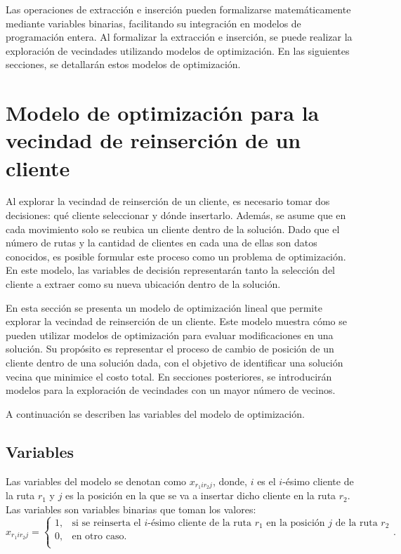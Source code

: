 \documentclass[12pt]{report}
\begin{document}
	Las operaciones de extracción e inserción pueden formalizarse matemáticamente mediante variables binarias, facilitando su integración en modelos de programación entera. Al formalizar la extracción e inserción, se puede realizar la exploración de vecindades utilizando modelos de optimización. En las siguientes secciones, se detallarán estos modelos de optimización.

		\section {Modelo de optimización para la vecindad de reinserción de un cliente}
	\label{sec:Modelo de optimización para la vecindad de reinserción de un cliente}

	Al explorar la vecindad de reinserción de un cliente, es necesario tomar dos decisiones: qué cliente seleccionar y dónde insertarlo. Además, se asume que en cada movimiento solo se reubica un cliente dentro de la solución. Dado que el número de rutas y la cantidad de clientes en cada una de ellas son datos conocidos, es posible formular este proceso como un problema de optimización. En este modelo, las variables de decisión representarán tanto la selección del cliente a extraer como su nueva ubicación dentro de la solución.

	En esta sección se presenta un modelo de optimización lineal que permite explorar la vecindad de reinserción de un cliente. Este modelo muestra cómo se pueden utilizar modelos de optimización para evaluar modificaciones en una solución. Su propósito es representar el proceso de cambio de posición de un cliente dentro de una solución dada, con el objetivo de identificar una solución vecina que minimice el costo total. En secciones posteriores, se introducirán modelos para la exploración de vecindades con un mayor número de vecinos.

	A continuación se describen las variables del modelo de optimización.

	\subsection{Variables}
	Las variables del modelo se denotan como $x_{r_1ir_2j}$, donde, $i$ es el $i$-ésimo cliente de la ruta $r_1$ y $j$ es la posición en la que se va a insertar dicho cliente en la ruta $r_2$. Las variables son variables binarias que toman los valores:
	\[
	x_{r_1ir_2j}=
	\begin{cases}
		1, & \text{si se reinserta el $i$-ésimo cliente de la ruta $r_1$ en la posición $j$ de la ruta $r_2$}\\
		0, & \text{en otro caso.}\\
	\end{cases}
	.
      \]
\end{document}
